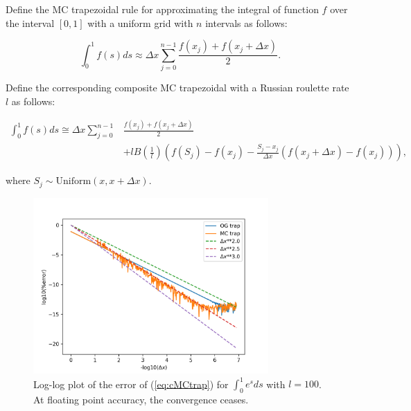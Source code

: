 \documentclass[a4paper,12pt]{article}
\begin{document}
\begin{definition} \label{MCtrap}
  Define the MC trapezoidal rule for approximating the integral
  of function $f$ over the interval $[0, 1]$ with a uniform grid
  with $n$ intervals as follows:

  \begin{equation}
    \int_{0}^{1} f(s) ds \approx \Delta x \sum_{j=0}^{n-1}  \frac{f(x_{j}) + f(x_{j}+\Delta x)}{2} .
  \end{equation}

  Define the  corresponding composite MC trapezoidal
  with a Russian roulette rate $l$ as follows:

  \begin{align} \label{eq:cMCtrap}
    \int_{0}^{1} f(s) ds \cong \Delta x \sum_{j=0}^{n-1} & \frac{f(x_{j}) + f(x_{j}+\Delta x)}{2} \nonumber \\
                                                         & + l B\left(\frac{1}{l}\right)
    \left(f(S_j) - f(x_{j}) - \frac{S_j - x_{j}}{\Delta x}(f(x_{j}+\Delta x) - f(x_{j}))\right),
  \end{align}


  where $S_j \sim \text{Uniform}(x,x+\Delta x)$.

\end{definition}



\begin{figure}[h!]
  \centering
  \includegraphics[width=0.8\textwidth]{plots/MCtrap.png}
  \caption{Log-log plot of the error of (\ref{eq:cMCtrap}) for
  $\int_{0}^{1}e^{s}ds$ with $l=100$. At floating point accuracy,
  the convergence ceases.
  }
  \label{fig:MCtrap}
\end{figure}
\end{document}
